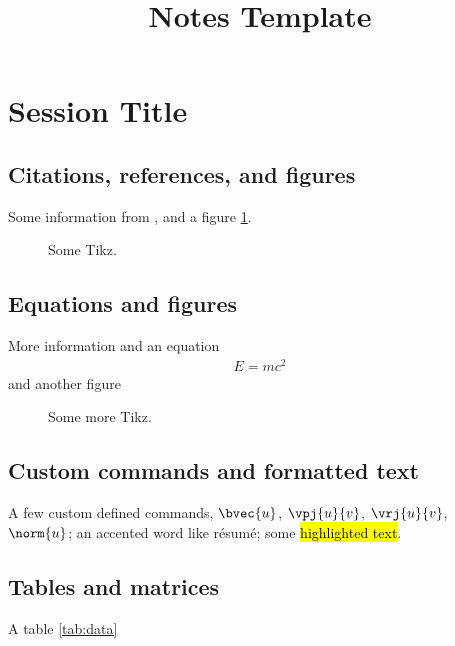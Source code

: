 \documentclass[11pt,a4paper]{article}
\title{Notes Template}
\begin{document}
\maketitle
\newpage

\tableofcontents %
\newpage

\section{Session Title}

\subsection{Citations, references, and figures}

Some information from \cite{feller1968}, 
and a figure \ref{fig:tikz1}.

\begin{figure}[!htb]
\centering

\caption{Some Tikz.}
\label{fig:tikz1}
\end{figure}

\subsection{Equations and figures}

More information and an equation
\begin{align}
E = mc^2
\end{align}
and another figure

\begin{figure}[!htb]
\centering

\caption{Some more Tikz.}
\label{fig:tikz2}
\end{figure}

\subsection{Custom commands and formatted text}

A few custom defined commands, \(\bvec{u}\), \(\vpj{u}{v}\), \(\vrj{u}{v}\), \(\norm{u}\); 
an accented word like résumé;
some \hl{highlighted text}.

\pagebreak

\subsection{Tables and matrices}

A table \ref{tab:data}
\end{document}
